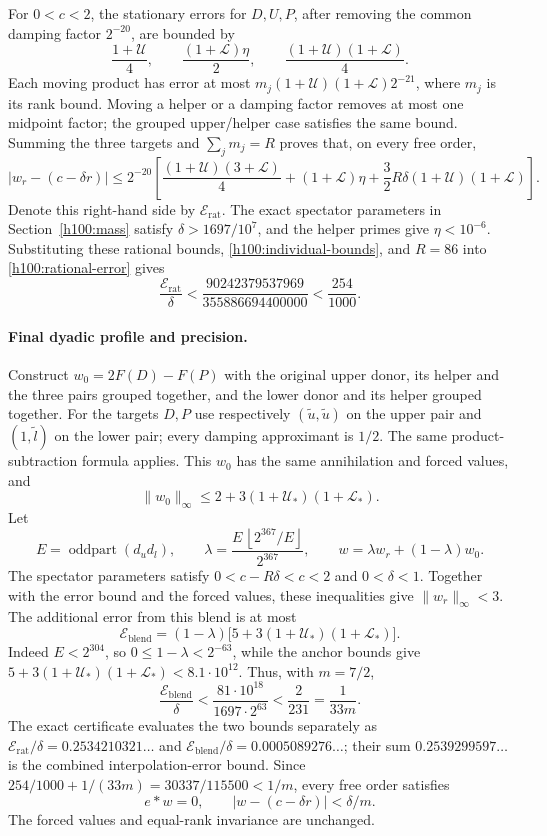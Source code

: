 \documentclass[11pt]{article}
\numberwithin{equation}{section}
\theoremstyle{definition}
\theoremstyle{remark}
\begin{document}
For $0<c<2$, the stationary errors for $D,U,P$, after removing the
common damping factor $2^{-20}$, are bounded by
\[
 \frac{1+\mathcal U}{4},\qquad
 \frac{(1+\mathcal L)\eta}{2},\qquad
 \frac{(1+\mathcal U)(1+\mathcal L)}4.
\]
Each moving product has error at most
$m_j(1+\mathcal U)(1+\mathcal L)2^{-21}$, where $m_j$ is its rank
bound.  Moving a helper or a damping factor removes at most one
midpoint factor; the grouped upper/helper case satisfies the same
bound.  Summing the three targets and $\sum_jm_j=R$ proves that, on
every free order,
\begin{equation}\label{h100:rational-error}
 |w_r-(c-\delta r)|\le2^{-20}
 \left[\frac{(1+\mathcal U)(3+\mathcal L)}4
       +(1+\mathcal L)\eta
       +\frac32R\delta(1+\mathcal U)(1+\mathcal L)\right].
\end{equation}
Denote this right-hand side by $\mathcal E_{\mathrm{rat}}$.  The exact
spectator parameters in Section~\ref{h100:mass} satisfy
$\delta>1697/10^7$, and the helper primes give $\eta<10^{-6}$.
Substituting these rational bounds, \eqref{h100:individual-bounds}, and
$R=86$ into \eqref{h100:rational-error} gives
\[
 \frac{\mathcal E_{\mathrm{rat}}}{\delta}
 <\frac{90242379537969}{355886694400000}
 <\frac{254}{1000}.
\]

\paragraph{Final dyadic profile and precision.}
Construct $w_0=2F(D)-F(P)$ with the original upper donor, its helper
and the three pairs grouped together, and the lower donor and its helper
grouped together.  For the targets $D,P$ use respectively
$(\widetilde u,\widetilde u)$ on the upper pair and
$(1,\widetilde l)$ on the lower pair; every damping approximant is
$1/2$.  The same product-subtraction formula applies.  This $w_0$ has
the same annihilation and forced values, and
\[
 \|w_0\|_\infty\le2+3(1+\mathcal U_*)(1+\mathcal L_*).
\]
Let
\[
 E=\operatorname{oddpart}(d_ud_l),\qquad
 \lambda=\frac{E\,\left\lfloor2^{367}/E\right\rfloor}{2^{367}},\qquad
 w=\lambda w_r+(1-\lambda)w_0.
\]
The spectator parameters satisfy $0<c-R\delta<c<2$ and $0<\delta<1$. Together with the error bound and the forced values, these inequalities give $\|w_r\|_\infty<3$.
The additional error from this blend is at most
\[
 \mathcal E_{\mathrm{blend}}=
 (1-\lambda)\bigl[5+3(1+\mathcal U_*)(1+\mathcal L_*)\bigr].
\]
Indeed $E<2^{304}$, so $0\le1-\lambda<2^{-63}$, while the anchor
bounds give $5+3(1+\mathcal U_*)(1+\mathcal L_*)<8.1\cdot10^{12}$.
Thus, with $m=7/2$,
\[
 \frac{\mathcal E_{\mathrm{blend}}}{\delta}
 <\frac{81\cdot10^{18}}{1697\cdot2^{63}}
 <\frac{2}{231}=\frac1{33m}.
\]
The exact certificate evaluates the two bounds separately as
$\mathcal E_{\mathrm{rat}}/\delta=0.2534210321\ldots$ and
$\mathcal E_{\mathrm{blend}}/\delta=0.0005089276\ldots$; their sum
$0.2539299597\ldots$ is the combined interpolation-error bound.
Since $254/1000+1/(33m)=30337/115500<1/m$, every free order satisfies
\begin{equation}\label{h100:final-profile}
 e*w=0,\qquad |w-(c-\delta r)|<\delta/m.
\end{equation}
The forced values and equal-rank invariance are unchanged.
\end{document}
